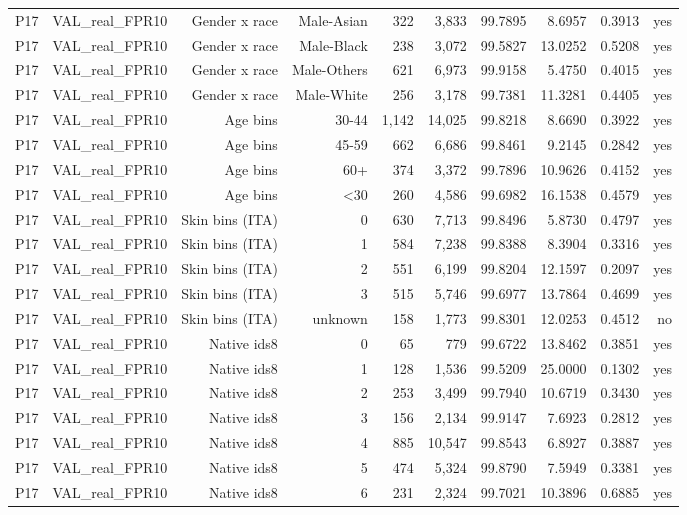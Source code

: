 \documentclass[10pt]{article}
\begin{document}
\begin{longtable}{@{}lrrrrrrrrr@{}}
P17 & VAL\_real\_FPR10 & Gender x race & Male-Asian & 322 & 3,833 & 99.7895 & 8.6957 & 0.3913 & yes \\
P17 & VAL\_real\_FPR10 & Gender x race & Male-Black & 238 & 3,072 & 99.5827 & 13.0252 & 0.5208 & yes \\
P17 & VAL\_real\_FPR10 & Gender x race & Male-Others & 621 & 6,973 & 99.9158 & 5.4750 & 0.4015 & yes \\
P17 & VAL\_real\_FPR10 & Gender x race & Male-White & 256 & 3,178 & 99.7381 & 11.3281 & 0.4405 & yes \\
P17 & VAL\_real\_FPR10 & Age bins & 30-44 & 1,142 & 14,025 & 99.8218 & 8.6690 & 0.3922 & yes \\
P17 & VAL\_real\_FPR10 & Age bins & 45-59 & 662 & 6,686 & 99.8461 & 9.2145 & 0.2842 & yes \\
P17 & VAL\_real\_FPR10 & Age bins & 60+ & 374 & 3,372 & 99.7896 & 10.9626 & 0.4152 & yes \\
P17 & VAL\_real\_FPR10 & Age bins & \textless{}30 & 260 & 4,586 & 99.6982 & 16.1538 & 0.4579 & yes \\
P17 & VAL\_real\_FPR10 & Skin bins (ITA) & 0 & 630 & 7,713 & 99.8496 & 5.8730 & 0.4797 & yes \\
P17 & VAL\_real\_FPR10 & Skin bins (ITA) & 1 & 584 & 7,238 & 99.8388 & 8.3904 & 0.3316 & yes \\
P17 & VAL\_real\_FPR10 & Skin bins (ITA) & 2 & 551 & 6,199 & 99.8204 & 12.1597 & 0.2097 & yes \\
P17 & VAL\_real\_FPR10 & Skin bins (ITA) & 3 & 515 & 5,746 & 99.6977 & 13.7864 & 0.4699 & yes \\
P17 & VAL\_real\_FPR10 & Skin bins (ITA) & unknown & 158 & 1,773 & 99.8301 & 12.0253 & 0.4512 & no \\
P17 & VAL\_real\_FPR10 & Native ids8 & 0 & 65 & 779 & 99.6722 & 13.8462 & 0.3851 & yes \\
P17 & VAL\_real\_FPR10 & Native ids8 & 1 & 128 & 1,536 & 99.5209 & 25.0000 & 0.1302 & yes \\
P17 & VAL\_real\_FPR10 & Native ids8 & 2 & 253 & 3,499 & 99.7940 & 10.6719 & 0.3430 & yes \\
P17 & VAL\_real\_FPR10 & Native ids8 & 3 & 156 & 2,134 & 99.9147 & 7.6923 & 0.2812 & yes \\
P17 & VAL\_real\_FPR10 & Native ids8 & 4 & 885 & 10,547 & 99.8543 & 6.8927 & 0.3887 & yes \\
P17 & VAL\_real\_FPR10 & Native ids8 & 5 & 474 & 5,324 & 99.8790 & 7.5949 & 0.3381 & yes \\
P17 & VAL\_real\_FPR10 & Native ids8 & 6 & 231 & 2,324 & 99.7021 & 10.3896 & 0.6885 & yes \\

\end{longtable}
\end{document}
